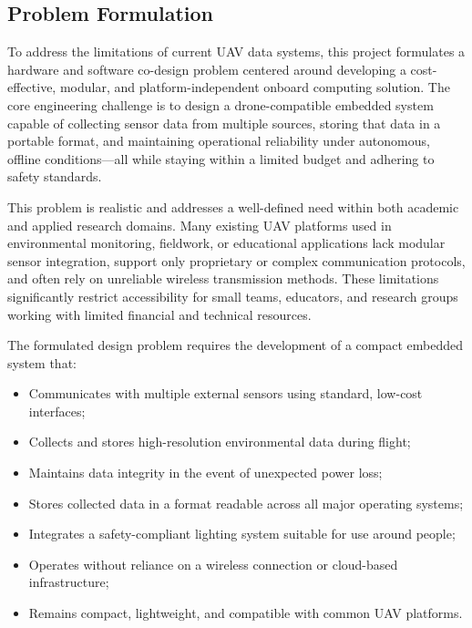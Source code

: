 \documentclass[12pt]{article}
\begin{document}
\subsection{Problem Formulation}

To address the limitations of current UAV data systems, this project formulates a hardware and software co-design problem centered around developing a cost-effective, modular, and platform-independent onboard computing solution. The core engineering challenge is to design a drone-compatible embedded system capable of collecting sensor data from multiple sources, storing that data in a portable format, and maintaining operational reliability under autonomous, offline conditions—all while staying within a limited budget and adhering to safety standards.

This problem is realistic and addresses a well-defined need within both academic and applied research domains. Many existing UAV platforms used in environmental monitoring, fieldwork, or educational applications lack modular sensor integration, support only proprietary or complex communication protocols, and often rely on unreliable wireless transmission methods. These limitations significantly restrict accessibility for small teams, educators, and research groups working with limited financial and technical resources.

The formulated design problem requires the development of a compact embedded system that:
\begin{itemize}
    \item Communicates with multiple external sensors using standard, low-cost interfaces;
    \item Collects and stores high-resolution environmental data during flight;
    \item Maintains data integrity in the event of unexpected power loss;
    \item Stores collected data in a format readable across all major operating systems;
    \item Integrates a safety-compliant lighting system suitable for use around people;
    \item Operates without reliance on a wireless connection or cloud-based infrastructure;
    \item Remains compact, lightweight, and compatible with common UAV platforms.
\end{itemize}
\end{document}
